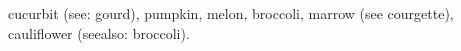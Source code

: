 \documentclass{article}
\begin{document}
\gls{cucurbit} (see: gourd), 
\gls{pumpkin}, \gls{melon}, \gls{broccoli},
\gls{marrow} (see courgette), \gls{cauliflower} (seealso: broccoli).

\printunsrtglossaries
\end{document}
